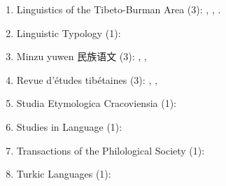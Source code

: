 \documentclass[oldfontcommands,oneside,a4paper,11pt]{article}
\newcommand{\zh}[1]{{\cn #1}}
\begin{document}
\begin{enumerate}
 \item Linguistics of the Tibeto-Burman Area (3): \citet{jacques09wazur}, \citet{jacques13tropative}, \citet{jacques14linking}.
 \item Linguistic Typology (1): \citet{jacques13harmonization}
 \item Minzu yuwen \zh{民族语文} (3): \citet{jacques03s.houzhui}, \citet{jacques04redupl}, \citet{jacques08weiyu}
 \item Revue d'études tibétaines (3): \citet{jacques07naksatram},  \citet{jacques08debther},   \citet{jacques10ndr}
 \item Studia Etymologica Cracoviensia (1):  \citet{jacques13vama}
  \item Studies in Language (1): \citet{jacques14auditory}
  \item Transactions of the Philological Society (1):  \citet{jacques12internal}
  \item Turkic Languages (1): \citet{antonov12kumush}
 \end{enumerate} 
 
\end{document}
